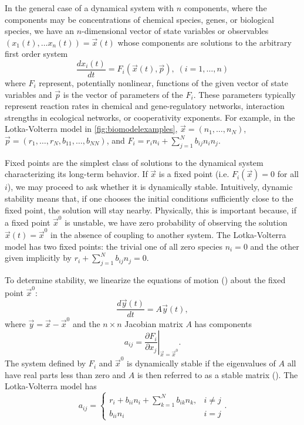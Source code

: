 
In the general case of a dynamical system with $n$ components, where the components may be concentrations of chemical species, genes, or biological species, we have an $n$-dimensional vector of state variables or observables $(x_1(t), \ldots x_n(t)) = \vec{x}(t)
$
whose components are solutions to the arbitrary first order system
\begin{equation}\label{eq:eom}
\frac{dx_i(t)}{dt} = F_i(\vec{x}(t), \vec{p}), \; (i=1,\ldots,n)
\end{equation}
where $F_i$ represent, potentially nonlinear, functions of the given vector of state variables and $\vec{p}$ is the vector of parameters of the $F_i$. These parameters typically represent reaction rates in chemical and gene-regulatory networks, interaction strengths in ecological networks, or cooperativity exponents. For example, in the Lotka-Volterra model in \ref{fig:biomodelexamples}, $\vec{x} = (n_1, \ldots, n_N)$, $\vec{p}=(r_1,\ldots,r_N,b_{11},\ldots,b_{NN})$, and $F_i = r_i n_i + \sum_{j=1}^{N} b_{ij} n_i n_j$.

Fixed points are the simplest class of solutions to the dynamical system characterizing its long-term behavior. If $\vec x$ is a fixed point (i.e. $F_i(\vec{x})=0$ for all $i$), we
may proceed to ask whether it is dynamically stable.
Intuitively, dynamic stability means that, if one chooses the initial
conditions sufficiently close to the fixed point, the solution will
stay nearby.  Physically, this is important because,
if a fixed point ${\vec x}^0$ is unstable, we have zero probability of
observing the solution ${\vec x}(t) = {\vec x}^0$ in the absence of coupling to another system. The Lotka-Volterra model has two fixed points: the trivial one of all zero species $n_i=0$ and the other given implicitly by $r_i + \sum_{j=1}^{N} b_{ij} n_j = 0$.

To determine stability, we linearize the equations of motion () about the
fixed point $\vec{x}^0$:
\begin{equation}\label{eq:lineardynsys}
\frac{d\vec{y}(t)}{dt} = A \vec{y}(t),
\end{equation}
where $\vec{y} = \vec{x} - \vec{x}^0$ and the $n \times n$ Jacobian matrix $A$ has components
$$
a_{ij} = \left. \frac{\partial F_i}{\partial x_j} \right|_{\vec{x} = \vec{x}^0}.
$$
The system defined by $F_i$ and $\vec{x}^0$ is dynamically stable if the eigenvalues of $A$ all have real parts less than zero and $A$ is then referred to as a stable matrix (). The Lotka-Volterra model has
 \begin{equation}\label{eq:lotkavolterrajacobian}
   a_{ij} = \left\{
     \begin{array}{lr}
       r_i + b_{ii} n_i + \sum_{k=1}^{N} b_{ik} n_{k}, & i \neq j\\
       b_{ii} n_i & i=j
     \end{array}.
   \right.
\end{equation}

